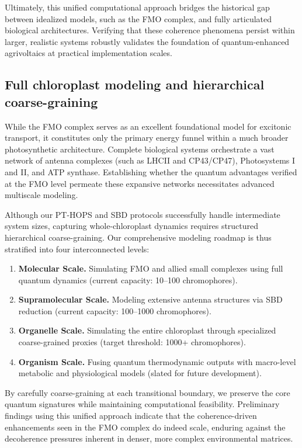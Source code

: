 Ultimately, this unified computational approach bridges the historical gap between idealized models, such as the FMO complex, and fully articulated biological architectures. Verifying that these coherence phenomena persist within larger, realistic systems robustly validates the foundation of quantum-enhanced agrivoltaics at practical implementation scales.

\subsection{Full chloroplast modeling and hierarchical coarse-graining}

While the FMO complex serves as an excellent foundational model for excitonic transport, it constitutes only the primary energy funnel within a much broader photosynthetic architecture. Complete biological systems orchestrate a vast network of antenna complexes (such as LHCII and CP43/CP47), Photosystems I and II, and ATP synthase. Establishing whether the quantum advantages verified at the FMO level permeate these expansive networks necessitates advanced multiscale modeling.

Although our PT-HOPS and SBD protocols successfully handle intermediate system sizes, capturing whole-chloroplast dynamics requires structured hierarchical coarse-graining. Our comprehensive modeling roadmap is thus stratified into four interconnected levels:
\begin{enumerate}
    \item \textbf{Molecular Scale.} Simulating FMO and allied small complexes using full quantum dynamics (current capacity: \numrange{10}{100} chromophores).
    \item \textbf{Supramolecular Scale.} Modeling extensive antenna structures via SBD reduction (current capacity: \numrange{100}{1000} chromophores).
    \item \textbf{Organelle Scale.} Simulating the entire chloroplast through specialized coarse-grained proxies (target threshold: \num{1000}+ chromophores).
    \item \textbf{Organism Scale.} Fusing quantum thermodynamic outputs with macro-level metabolic and physiological models (slated for future development).
\end{enumerate}
By carefully coarse-graining at each transitional boundary, we preserve the core quantum signatures while maintaining computational feasibility. Preliminary findings using this unified approach indicate that the coherence-driven enhancements seen in the FMO complex do indeed scale, enduring against the decoherence pressures inherent in denser, more complex environmental matrices.

